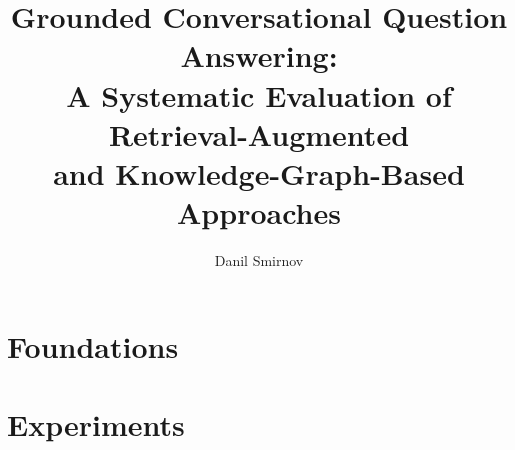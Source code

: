 \documentclass[%
]{unipd-thesis-modern}
\title{Grounded Conversational Question Answering:\\
A Systematic Evaluation of Retrieval-Augmented\\
and Knowledge-Graph-Based Approaches}
\author{Danil Smirnov}
\begin{document}
    \frontmatter

    \mainmatter

    
    \glsresetall


    \part{\label{prt:foundations}Foundations}

    
    


    \part{\label{prt:experiments}Experiments}

    
    
    
    
    
    
    
    
    
    


    

    \appendix
    

    \backmatter
\end{document}
